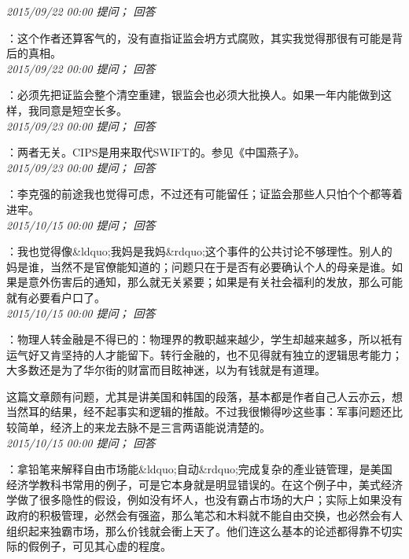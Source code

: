 \documentclass[twocolumn]{ctexart}
\begin{document}
\textit{\hfill\noindent\small 2015/09/22 00:00 提问； 回答}

：这个作者还算客气的，没有直指证监会坍方式腐败，其实我觉得那很有可能是背后的真相。\\

\textit{\hfill\noindent\small 2015/09/22 00:00 提问； 回答}

：必须先把证监会整个清空重建，银监会也必须大批换人。如果一年内能做到这样，我同意是短空长多。\\

\textit{\hfill\noindent\small 2015/09/23 00:00 提问； 回答}

：两者无关。CIPS是用来取代SWIFT的。参见《中国燕子》。\\

\textit{\hfill\noindent\small 2015/09/23 00:00 提问； 回答}

：李克强的前途我也觉得可虑，不过还有可能留任；证监会那些人只怕个个都等着进牢。\\

\textit{\hfill\noindent\small 2015/10/15 00:00 提问； 回答}

：我也觉得像\&ldquo;我妈是我妈\&rdquo;这个事件的公共讨论不够理性。别人的妈是谁，当然不是官僚能知道的；问题只在于是否有必要确认个人的母亲是谁。如果是意外伤害后的通知，那么就无关紧要；如果是有关社会福利的发放，那么可能就有必要看户口了。\\

\textit{\hfill\noindent\small 2015/10/15 00:00 提问； 回答}

：物理人转金融是不得已的：物理界的教职越来越少，学生却越来越多，所以衹有运气好又肯坚持的人才能留下。转行金融的，也不见得就有独立的逻辑思考能力；大多数还是为了华尔街的财富而目眩神迷，以为有钱就是有道理。

这篇文章颇有问题，尤其是讲美国和韩国的段落，基本都是作者自己人云亦云，想当然耳的结果，经不起事实和逻辑的推敲。不过我很懒得吵这些事：军事问题还比较简单，经济上的来龙去脉不是三言两语能说清楚的。\\

\textit{\hfill\noindent\small 2015/10/15 00:00 提问； 回答}

：拿铅笔来解释自由市场能\&ldquo;自动\&rdquo;完成复杂的產业链管理，是美国经济学教科书常用的例子，可是它本身就是明显错误的。在这个例子中，美式经济学做了很多隐性的假设，例如没有坏人，也没有霸占市场的大户；实际上如果没有政府的积极管理，必然会有强盗，那么笔芯和木料就不能自由交换，也必然会有人组织起来独霸市场，那么价钱就会衝上天了。他们连这么基本的论述都得靠不切实际的假例子，可见其心虚的程度。\\
\end{document}
